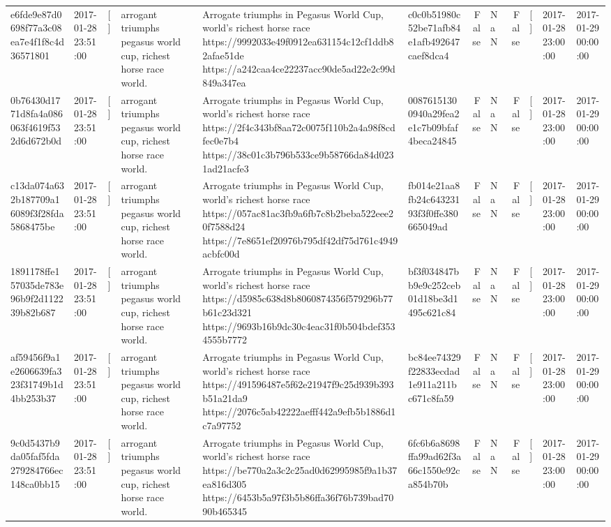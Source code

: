 \begin{tabular}{llllllrlrlll}
e6fde9e87d0698f77a3c08ea7e4f1f8c4d36571801 & 2017-01-28 23:51:00 & [] & arrogant triumphs pegasus world cup, richest horse race world. & Arrogate triumphs in Pegasus World Cup, world's richest horse race https://9992033e49f0912ea631154c12cf1ddb82afae51de https://a242caa4ce22237acc90de5ad22e2c99d849a347ea & c0c0b51980c52be71afb84e1afb492647caef8dca4 & False & NaN & False & [] & 2017-01-28 23:00:00 & 2017-01-29 00:00:00 \\
0b76430d1771d8fa4a086063f4619f532d6d672b0d & 2017-01-28 23:51:00 & [] & arrogant triumphs pegasus world cup, richest horse race world. & Arrogate triumphs in Pegasus World Cup, world's richest horse race https://2f4c343bf8aa72c0075f110b2a4a98f8cdfec0e7b4 https://38c01c3b796b533ce9b58766da84d0231ad21acfe3 & 00876151300940a29fea2e1c7b09bfaf4beca24845 & False & NaN & False & [] & 2017-01-28 23:00:00 & 2017-01-29 00:00:00 \\
c13da074a632b187709a16089f3f28fda5868475be & 2017-01-28 23:51:00 & [] & arrogant triumphs pegasus world cup, richest horse race world. & Arrogate triumphs in Pegasus World Cup, world's richest horse race https://057ac81ac3fb9a6fb7c8b2beba522eee20f7588d24 https://7e8651ef20976b795df42df75d761c4949acbfc00d & fb014e21aa8fb24c64323193f3f0ffe380665049ad & False & NaN & False & [] & 2017-01-28 23:00:00 & 2017-01-29 00:00:00 \\
1891178ffe157035de783e96b9f2d112239b82b687 & 2017-01-28 23:51:00 & [] & arrogant triumphs pegasus world cup, richest horse race world. & Arrogate triumphs in Pegasus World Cup, world's richest horse race https://d5985c638d8b8060874356f579296b77b61c23d321 https://9693b16b9dc30c4eac31f0b504bdef3534555b7772 & bf3f034847bb9e9c252ceb01d18be3d1495c621c84 & False & NaN & False & [] & 2017-01-28 23:00:00 & 2017-01-29 00:00:00 \\
af59456f9a1e2606639fa323f31749b1d4bb253b37 & 2017-01-28 23:51:00 & [] & arrogant triumphs pegasus world cup, richest horse race world. & Arrogate triumphs in Pegasus World Cup, world's richest horse race https://491596487e5f62e21947f9c25d939b393b51a21da9 https://2076c5ab42222aefff442a9efb5b1886d1c7a97752 & bc84ee74329f22833ecdad1e911a211bc671c8fa59 & False & NaN & False & [] & 2017-01-28 23:00:00 & 2017-01-29 00:00:00 \\
9c0d5437b9da05faf5fda279284766ec148ca0bb15 & 2017-01-28 23:51:00 & [] & arrogant triumphs pegasus world cup, richest horse race world. & Arrogate triumphs in Pegasus World Cup, world's richest horse race https://be770a2a3c2c25ad0d62995985f9a1b37ea816d305 https://6453b5a97f3b5b86ffa36f76b739bad7090b465345 & 6fc6b6a8698ffa99ad62f3a66c1550e92ca854b70b & False & NaN & False & [] & 2017-01-28 23:00:00 & 2017-01-29 00:00:00 \\

\end{tabular}
